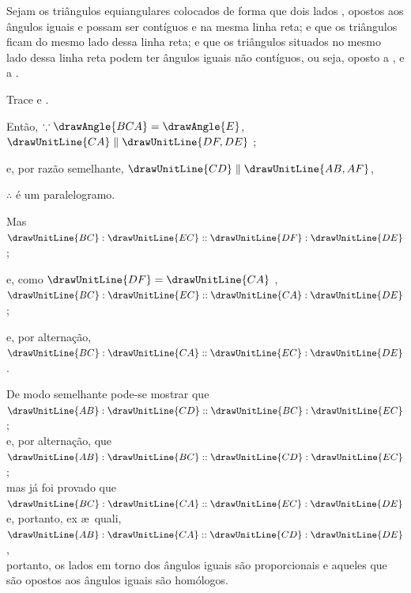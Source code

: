 \documentclass[booklanguage=brazilian]{byrnebook}
\begin{document}
Sejam os triângulos equiangulares colocados de forma que dois lados ,  opostos aos ângulos iguais  e  possam ser contíguos e na mesma linha reta; e que os triângulos ficam do mesmo lado dessa linha reta; e que os triângulos situados no mesmo lado dessa linha reta podem ter ângulos iguais não contíguos, ou seja,  oposto a , e  a .

\begin{center}
Trace  e .

Então, $\because \drawAngle{BCA} = \drawAngle{E}$, $\drawUnitLine{CA} \parallel \drawUnitLine{DF,DE}$ ; %

e, por razão semelhante, $\drawUnitLine{CD} \parallel \drawUnitLine{AB,AF}$,

$\therefore$
é um paralelogramo.

Mas $\drawUnitLine{BC} : \drawUnitLine{EC} :: \drawUnitLine{DF} : \drawUnitLine{DE}$ ;

e, como $\drawUnitLine{DF} = \drawUnitLine{CA}$ ,\\
$\drawUnitLine{BC} : \drawUnitLine{EC} :: \drawUnitLine{CA} : \drawUnitLine{DE}$;

e, por alternação, $\drawUnitLine{BC} : \drawUnitLine{CA} :: \drawUnitLine{EC} : \drawUnitLine{DE}$ .

De modo semelhante pode-se mostrar que\\
$\drawUnitLine{AB} : \drawUnitLine{CD} :: \drawUnitLine{BC} : \drawUnitLine{EC}$;\\
e, por alternação, que\\
$\drawUnitLine{AB} : \drawUnitLine{BC} :: \drawUnitLine{CD} : \drawUnitLine{EC}$;\\
mas já foi provado que\\
$\drawUnitLine{BC} : \drawUnitLine{CA} :: \drawUnitLine{EC} : \drawUnitLine{DE}$\\
e, portanto, ex \ae\ quali,\\
$\drawUnitLine{AB} : \drawUnitLine{CA} :: \drawUnitLine{CD} : \drawUnitLine{DE}$ ,\\
portanto, os lados em torno dos ângulos iguais são proporcionais e aqueles que são opostos aos ângulos iguais são homólogos.
\end{center}
\end{document}
